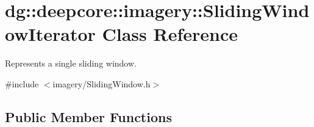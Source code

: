 \hypertarget{classdg_1_1deepcore_1_1imagery_1_1_sliding_window_iterator}{}\section{dg\+:\+:deepcore\+:\+:imagery\+:\+:Sliding\+Window\+Iterator Class Reference}
\label{classdg_1_1deepcore_1_1imagery_1_1_sliding_window_iterator}


Represents a single sliding window.  




{\ttfamily \#include $<$imagery/\+Sliding\+Window.\+h$>$}

\subsection*{Public Member Functions}
